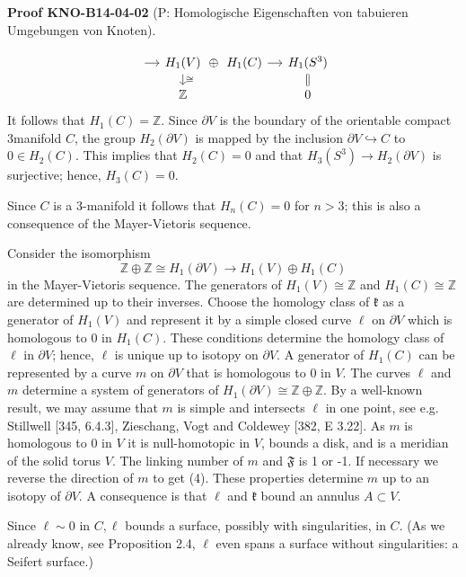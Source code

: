 \documentclass[10pt, letterpaper]{article}
\newcommand{\CustomHeading}[3]{%
  \par\medskip\noindent%
  \textbf{#1 #2} \textnormal{(#3)}.\enskip%
}
\newenvironment{PROOF}[2]{\begin{unitbox}\CustomHeading{Proof}{#1}{#2}}{\end{unitbox}}
\begin{document}
\begin{PROOF}{KNO-B14-04-02}{P: Homologische Eigenschaften von tabuieren Umgebungen von Knoten}
\[
\begin{tikzcd}[row sep=small, column sep=small]
{} \arrow[r] 
  & H_1(V) \arrow[r, phantom, "\oplus"] \arrow[d, "\cong"] & H_1(C) \arrow[r]
  & H_1(S^3) \arrow[d, equal] \\
{} & \mathbb{Z} & {} & 0
\end{tikzcd}
\]
It follows that $H_{1}(C)=\mathbb{Z}$. Since $\partial V$ is the boundary of the orientable compact 3manifold $C$, the group $H_{2}(\partial V)$ is mapped by the inclusion $\partial V \hookrightarrow C$ to $0 \in H_{2}(C)$. This implies that $H_{2}(C)=0$ and that $H_{3}\left(S^{3}\right) \rightarrow H_{2}(\partial V)$ is surjective; hence, $H_{3}(C)=0$.


Since $C$ is a 3-manifold it follows that $H_{n}(C)=0$ for $n>3$; this is also a consequence of the Mayer-Vietoris sequence.

Consider the isomorphism
$$
\mathbb{Z} \oplus \mathbb{Z} \cong H_{1}(\partial V) \rightarrow H_{1}(V) \oplus H_{1}(C)
$$
in the Mayer-Vietoris sequence. The generators of $H_{1}(V) \cong \mathbb{Z}$ and $H_{1}(C) \cong \mathbb{Z}$ are determined up to their inverses. Choose the homology class of $\mathfrak{k}$ as a generator of $H_{1}(V)$ and represent it by a simple closed curve $\ell$ on $\partial V$ which is homologous to 0 in $H_{1}(C)$. These conditions determine the homology class of $\ell$ in $\partial V$; hence, $\ell$ is unique up to isotopy on $\partial V$. A generator of $H_{1}(C)$ can be represented by a curve $m$ on $\partial V$ that is homologous to 0 in $V$. The curves $\ell$ and $m$ determine a system of generators of $H_{1}(\partial V) \cong \mathbb{Z} \oplus \mathbb{Z}$. By a well-known result, we may assume that $m$ is simple and intersects $\ell$ in one point, see e.g. Stillwell [345, 6.4.3], Zieschang, Vogt and Coldewey [382, E 3.22]. As $m$ is homologous to 0 in $V$ it is null-homotopic in $V$, bounds a disk, and is a meridian of the solid torus $V$. The linking number of $m$ and $\mathfrak{F}$ is 1 or -1. If necessary we reverse the direction of $m$ to get (4). These properties determine $m$ up to an isotopy of $\partial V$. A consequence is that $\ell$ and $\mathfrak{k}$ bound an annulus $A \subset V$.

Since $\ell \sim 0$ in $C, \ell$ bounds a surface, possibly with singularities, in $C$. (As we already know, see Proposition 2.4, $\ell$ even spans a surface without singularities: a Seifert surface.)
\end{PROOF}
\end{document}
